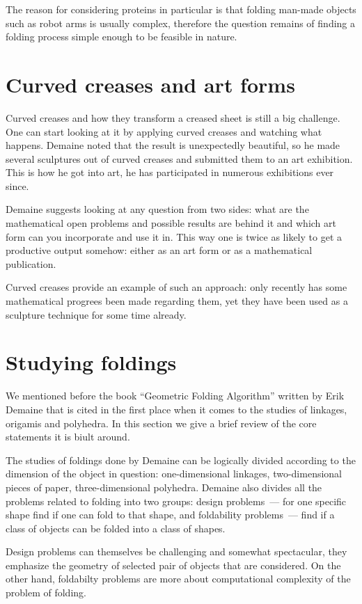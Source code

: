 \documentclass[a4paper,12pt]{article}
\begin{document}
The reason for considering proteins in particular is that folding man-made objects such as robot arms is usually complex, therefore the question remains of finding a folding process simple enough to be feasible in nature.

\section{Curved creases and art forms}

Curved creases and how they transform a creased sheet is still a big challenge. One can start looking at it by applying curved creases and watching what happens. Demaine noted that the result is unexpectedly beautiful, so he made several sculptures out of curved creases and submitted them to an art exhibition. This is how he got into art, he has participated in numerous exhibitions ever since.

Demaine suggests looking at any question from two sides: what are the mathematical open problems and possible results are behind it and which art form can you incorporate and use it in. This way one is twice as likely to get a productive output somehow: either as an art form or as a mathematical publication.

Curved creases provide an example of such an approach: only recently has some mathematical progrees been made regarding them, yet they have been used as a sculpture technique for some time already.

\section{Studying foldings}

We mentioned before the book “Geometric Folding Algorithm” written by Erik Demaine that is cited in the first place when it comes to the studies of linkages, origamis and polyhedra. In this section we give a brief review of the core statements it is biult around.

The studies of foldings done by Demaine can be logically divided according to the dimension of the object in question: one-dimensional linkages, two-dimensional pieces of paper, three-dimensional polyhedra. Demaine also divides all the problems related to folding into two groups: design problems~— for one specific shape find if one can fold to that shape, and foldability problems~— find if a class of objects can be folded into a class of shapes.

Design problems can themselves be challenging and somewhat spectacular, they emphasize the geometry of selected pair of objects that are considered. On the other hand, foldabilty problems are more about computational complexity of the problem of folding.
\end{document}
